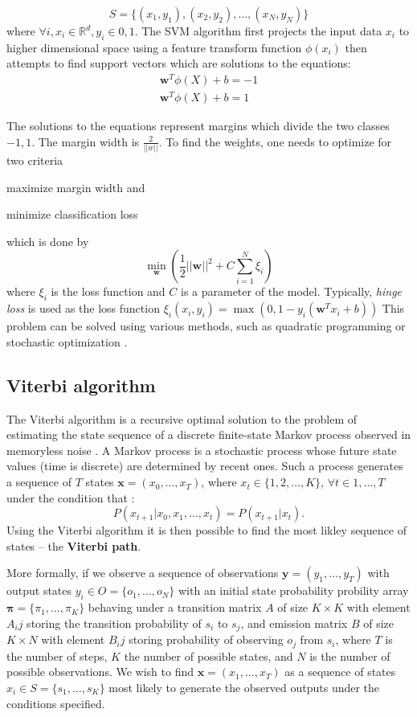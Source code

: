 $$
S = \{(x_1, y_1), (x_2, y_2), \dots, (x_N, y_N)\}
$$
where $\forall i, x_i \in \mathbb{R}^d, y_i \in {0, 1}$.
The SVM algorithm first projects the input data $x_i$ to 
higher dimensional space using a 
feature transform function $\phi(x_i)$ then attempts to 
find support vectors which are solutions to the equations:
\begin{align*}
\textbf{w}^T \phi(X) + b = -1 \\
\textbf{w}^T \phi(X) + b = 1
\end{align*}

The solutions to the equations represent margins which divide
the two classes ${-1, 1}$.
The margin width is $\frac{2}{||w||}$. 
To find the weights, one needs to 
optimize for two criteria 
\begin{enumerate*}[label=(\arabic*)]
\item maximize margin width and
\item minimize classification loss
\end{enumerate*} which is done by
$$
\min_{\textbf{w}} \left( \frac{1}{2}||\textbf{w}||^2 + C \sum_{i=1}^{N} \xi_i \right)
$$
where $\xi_i$ is the loss function and $C$ is a parameter of the model.
Typically, \textit{hinge loss} is used as the loss function $\xi_i(x_i, y_i) =
\max(0, 1 - y_i(\textbf{w}^T x_i + b))$ This problem can be solved using
various methods, such as quadratic programming \citep{wu2005svm} or stochastic
optimization \citep{wang2012breaking}.

\subsection{Viterbi algorithm}
\label{sec:viterbi}

The Viterbi algorithm is a recursive optimal solution to the problem of
estimating the state sequence of a discrete finite-state Markov process
\citep{howard1960dynamic} observed in memoryless noise
\citep{forney1973viterbi}. A Markov process is a stochastic process
whose future state values (time is discrete) are determined by
recent ones. Such a process generates a sequence of $T$ states 
$\textbf{x} = (x_0, \dots, x_T)$, where 
$x_t \in \{1, 2, \dots, K\}$, $\forall t \in {1, \dots, T}$
under the condition that :
$$
P(x_{t + 1} | x_0, x_1,\dots,x_t) = P(x_{t + 1} | x_t).
$$
Using the Viterbi algorithm it is then possible 
to find the most likley sequence of states -- 
the \textbf{Viterbi path}.

More formally, if we observe a sequence of
observations $\textbf{y} = (y_1, \dots, y_T)$ with output states
$y_i \in O = \{o_1, \dots, o_N\}$ with an initial state probability
probility array $\bm{\pi} = \{\pi_1,\dots, \pi_K\}$
behaving under a transition matrix $A$ of size $K \times K$
with element $A_ij$ storing the transition probability of
$s_i$ to $s_j$, 
and emission matrix $B$ of size $K \times N$ with 
element $B_ij$ storing probability of observing $o_j$ from $s_i$,
where $T$ is the number of steps, 
$K$ the number of possible states, and $N$ is the number of 
possible observations. We wish to find
$\textbf{x} = (x_1, \dots, x_T)$
as a sequence of states $x_i \in S = \{s_1, \dots, s_K\}$ 
most likely to generate the observed outputs under the 
conditions specified. 

